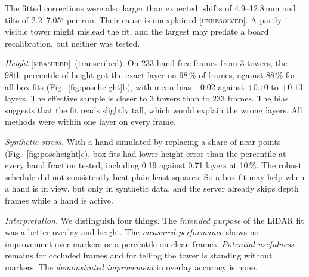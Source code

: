 \documentclass[conference,10pt]{IEEEtran}
\newcommand{\evM}{\textsc{[measured]}}
\newcommand{\evU}{\textsc{[unresolved]}}
\begin{document}
The fitted corrections were also larger than expected: shifts of 4.9--12.8\,mm and tilts of 2.2--7.05$^\circ$ per run. Their cause is unexplained \evU. A partly visible tower might mislead the fit, and the largest may predate a board recalibration, but neither was tested.

\emph{Height} \evM\ (transcribed). On 233 hand-free frames from 3 towers, the 98th percentile of height got the exact layer on 98\,\% of frames, against 88\,\% for all box fits (Fig.~\ref{fig:poseheight}b), with mean bias $+0.02$ against $+0.10$ to $+0.13$ layers. The effective sample is closer to 3 towers than to 233 frames. The bias suggests that the fit reads slightly tall, which would explain the wrong layers. All methods were within one layer on every frame.

\emph{Synthetic stress.} With a hand simulated by replacing a share of near points (Fig.~\ref{fig:poseheight}c), box fits had lower height error than the percentile at every hand fraction tested, including 0.19 against 0.71 layers at 10\,\%. The robust schedule did not consistently beat plain least squares. So a box fit may help when a hand is in view, but only in synthetic data, and the server already skips depth frames while a hand is active.

\emph{Interpretation.} We distinguish four things. The \emph{intended purpose} of the LiDAR fit was a better overlay and height. The \emph{measured performance} shows no improvement over markers or a percentile on clean frames. \emph{Potential usefulness} remains for occluded frames and for telling the tower is standing without markers. The \emph{demonstrated improvement} in overlay accuracy is none.
\end{document}
